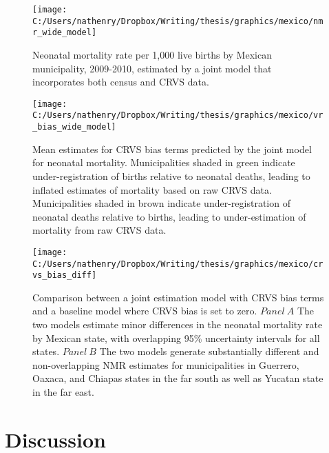 \documentclass[
]{article}
\begin{document}
\begin{figure}[!ht]

{\centering \texttt{[image: C:/Users/nathenry/Dropbox/Writing/thesis/graphics/mexico/nmr\_wide\_model]} 

}

\caption{Neonatal mortality rate per 1,000 live births by Mexican municipality, 2009-2010, estimated by a joint model that incorporates both census and CRVS data.}\label{fig:nmr-wide-model}
\end{figure}

\begin{figure}[!ht]

{\centering \texttt{[image: C:/Users/nathenry/Dropbox/Writing/thesis/graphics/mexico/vr\_bias\_wide\_model]} 

}

\caption{Mean estimates for CRVS bias terms predicted by the joint model for neonatal mortality. Municipalities shaded in green indicate under-registration of births relative to neonatal deaths, leading to inflated estimates of mortality based on raw CRVS data. Municipalities shaded in brown indicate under-registration of neonatal deaths relative to births, leading to under-estimation of mortality from raw CRVS data.}\label{fig:vr-bias-wide-model}
\end{figure}

\begin{figure}[!p]

{\centering \texttt{[image: C:/Users/nathenry/Dropbox/Writing/thesis/graphics/mexico/crvs\_bias\_diff]} 

}

\caption{Comparison between a joint estimation model with CRVS bias terms and a baseline model where CRVS bias is set to zero. \(Panel\ A\) The two models estimate minor differences in the neonatal mortality rate by Mexican state, with overlapping 95\% uncertainty intervals for all states. \(Panel\ B\) The two models generate substantially different and non-overlapping NMR estimates for municipalities in Guerrero, Oaxaca, and Chiapas states in the far south as well as Yucatan state in the far east.}\label{fig:crvs-bias-diff}
\end{figure}

\hypertarget{discussion}{%
\section{Discussion}\label{discussion}}
\end{document}
